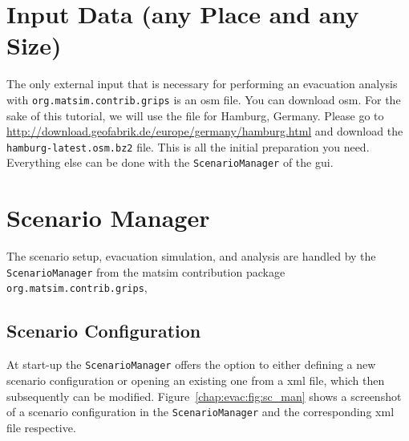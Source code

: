 \section{Input Data (any Place and any Size)}
\label{grips:input}
The only external input that is necessary for performing an evacuation analysis with \lstinline|org.matsim.contrib.grips| is an \gls{osm} file.
You can download \gls{osm}.
For the sake of this tutorial, we will use the file for Hamburg, Germany. Please go to \url{http://download.geofabrik.de/europe/germany/hamburg.html} and download the \lstinline|hamburg-latest.osm.bz2| file. This is all the initial preparation you need. Everything else can be done with the \lstinline|ScenarioManager| of the \gls{gui}.

\section{Scenario Manager}
\label{grips:scm}
The scenario setup, evacuation simulation, and analysis are handled by the \lstinline|ScenarioManager| from the \gls{matsim} contribution package \lstinline|org.matsim.contrib.grips|, 
\subsection{Scenario Configuration}
At start-up the \lstinline|ScenarioManager| offers the option to either defining a new scenario configuration or opening an existing one from a \gls{xml} file, which then subsequently can be modified. Figure~\ref{chap:evac:fig:sc_man} shows a screenshot of a scenario configuration in the \lstinline|ScenarioManager| and the corresponding \gls{xml} file respective.

